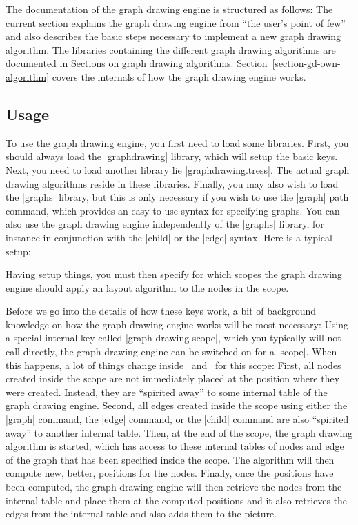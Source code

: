 The documentation of the graph drawing engine is structured as
follows: The current section explains the graph drawing engine from
``the user's point of few'' and also describes the basic steps
necessary to implement a new graph drawing algorithm. The libraries
containing the different graph drawing algorithms are documented in
Sections on graph drawing
algorithms. Section~\ref{section-gd-own-algorithm} covers the
internals of how the graph drawing engine works. 




\subsection{Usage}

To use the graph drawing engine, you first need to load some
libraries. First, you should always load the |graphdrawing| library,
which will setup the basic keys. Next, you need to load another
library lie |graphdrawing.tress|. The actual graph drawing
algorithms reside in these libraries. Finally, you may also wish to
load the |graphs| library, but this is only necessary if you wish to
use the |graph| path command, which provides an easy-to-use syntax for
specifying graphs. You can also use the graph drawing engine
independently of the |graphs| library, for instance in conjunction
with the |child| or the |edge| syntax. Here is a typical setup:

\begin{codeexample}
\usetikzlibrary{graphs,graphdrawing,graphdrawing.trees}  
\end{codeexample}

Having setup things, you must then specify for which scopes the
graph drawing engine should apply an layout algorithm to the nodes in
the scope.

Before we go into the details of how these keys work, a bit of
background knowledge on how the graph drawing engine works will be
most necessary: Using a special internal key called
|graph drawing scope|, which you typically will not call directly,
the graph drawing engine can be switched on for a |{scope}|. When this
happens, a lot of things change inside \pgfname\ and \tikzname\ for
this scope: First, all nodes created inside the scope are not
immediately placed at the position where they were created. Instead,
they are ``spirited away'' to some internal table of the graph drawing
engine. Second, all edges created inside the scope using either the
|graph| command, the |edge| command, or the |child| command are also
``spirited away'' to another internal table. Then, at the end of the
scope, the graph drawing algorithm is started, which has access to
these internal tables of nodes and edge of the graph that has been
specified inside the scope. The algorithm will then compute new,
better, positions for the nodes. Finally, once the positions have been
computed, the graph drawing engine will then retrieve the nodes from
the internal table and place them at the computed positions and it
also retrieves the edges from the internal table and also adds them to
the picture.

